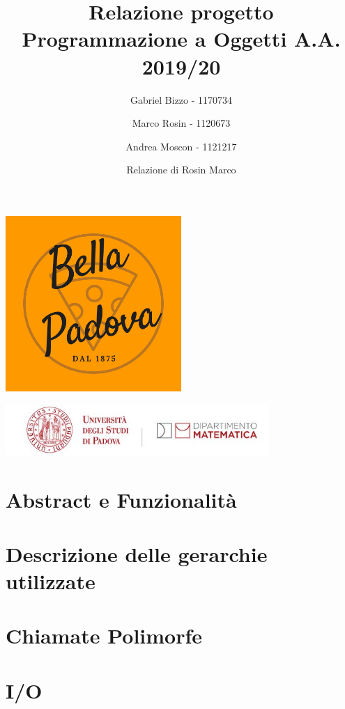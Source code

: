 \documentclass[
]{article}
\title{Relazione progetto Programmazione a Oggetti A.A. 2019/20}
\author{Gabriel Bizzo - 1170734 \\ \and Marco Rosin - 1120673 \\ \and Andrea Moscon - 1121217}
\date{Relazione di Rosin Marco}
\begin{document}
\maketitle

\begin{center}
  \includegraphics[width=0.5\textwidth,height=\textheight]{./logo.png}
\end{center}
\begin{center}
  \includegraphics[width=0.75\textwidth,height=\textheight]{./uniPD_DM.jpg}
\end{center}

\hypertarget{abstract-e-funzionalituxe0}{%
\section{Abstract e Funzionalità}\label{abstract-e-funzionalituxe0}}

\hypertarget{descrizione-delle-gerarchie-utilizzate}{%
\section{Descrizione delle gerarchie
utilizzate}\label{descrizione-delle-gerarchie-utilizzate}}

\hypertarget{chiamate-polimorfe}{%
\section{Chiamate Polimorfe}\label{chiamate-polimorfe}}

\hypertarget{io}{%
\section{I/O}\label{io}}
\end{document}
